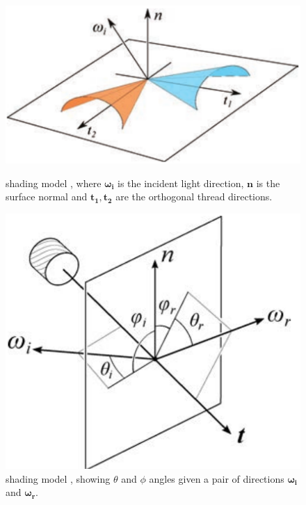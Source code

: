 \documentclass[12pt]{article}
\newcommand{\omegai}{\boldsymbol{\omega_i}}
\newcommand{\omegar}{\boldsymbol{\omega_r}}
\begin{document}
\begin{figure}[ht!]
\begin{minipage}[b]{.45\textwidth}
\centering
\includegraphics[width=1\textwidth]{images/microcylinders}
	\caption{\citeauthor{Sadeghi2013} shading model \cite{Sadeghi2013}, where $\omegai$ is the incident light direction, $\mathbf{n}$ is the surface normal and $\mathbf{t_1},\mathbf{t_2}$ are the orthogonal thread directions.}
	\label{fig:microcylinders}
\end{minipage}
\hfill
\begin{minipage}[b]{.45\textwidth}
\centering
\includegraphics[width=1\textwidth]{images/cloth_directions}
	\caption{\citeauthor{Sadeghi2013} shading model \cite{Sadeghi2013}, showing $\theta$ and $\phi$ angles given a pair of directions $\omegai$ and $\omegar$.}
	\label{fig:cloth_directions}
\end{minipage}
\end{figure}
\end{document}

